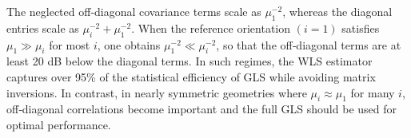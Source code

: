 \documentclass[lettersize,journal]{IEEEtran}
\begin{document}
The neglected off‐diagonal covariance terms scale as
$\mu_1^{-2}$, whereas the diagonal entries scale as
$\mu_i^{-2}+\mu_1^{-2}$.  When the reference orientation $(i=1)$
satisfies $\mu_1\gg\mu_i$ for most $i$, one obtains
$\mu_1^{-2}\ll\mu_i^{-2}$, so that the off‐diagonal terms are at least
20 dB below the diagonal terms.  In such regimes, the WLS estimator
captures over 95\% of the statistical efficiency of GLS while avoiding
matrix inversions.  In contrast, in nearly symmetric geometries where
$\mu_i\approx\mu_1$ for many $i$, off‐diagonal correlations become
important and the full GLS should be used for optimal performance.



\end{document}
